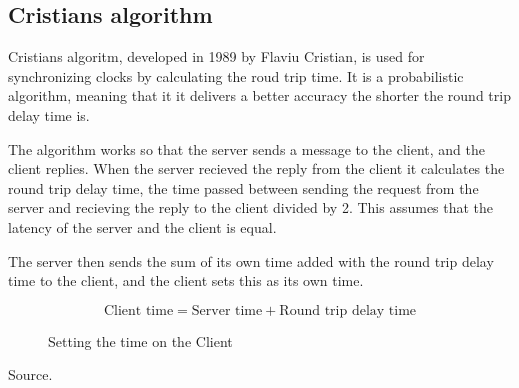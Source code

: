 \subsection{Cristians algorithm}
Cristians algoritm, developed in 1989 by Flaviu Cristian, is used for synchronizing clocks by calculating the roud trip time. It is a probabilistic algorithm\cite{cristian}, meaning that it it delivers a better accuracy the shorter the round trip delay time is. 

The algorithm works so that the server sends a message to the client, and the client replies. When the server recieved the reply from the client it calculates the round trip delay time, the time passed between sending the request from the server and recieving the reply to the client divided by 2. This assumes that the latency of the server and the client is equal.

The server then sends the sum of its own time added with the round trip delay time to the client, and the client sets this as its own time. 

\begin{figure}[h!]
	\begin{displaymath}
		\text{Client time} = \text{Server time} + \text{Round trip delay time}
	\end{displaymath}
	\caption{Setting the time on the Client}
	\label{fig:crist}
\end{figure}

Source\cite{cristian}.
